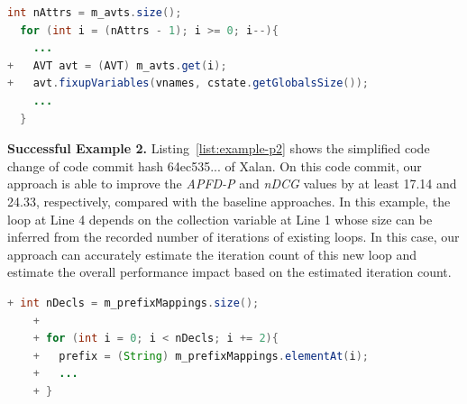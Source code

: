 

{\fontsize{10}{10}
\begin{lstlisting}[columns=flexible,language=Java,caption=Change Inside a Loop, label={list:example-p1}]
  int nAttrs = m_avts.size();
  for (int i = (nAttrs - 1); i >= 0; i--){
    ...
+   AVT avt = (AVT) m_avts.get(i);
+   avt.fixupVariables(vnames, cstate.getGlobalsSize());
    ...
  } 
\end{lstlisting}
}


\textbf{Successful Example 2.} Listing~\ref{list:example-p2} shows the simplified code change of code commit hash 64ec535... of Xalan. On this code commit, our approach is able to improve the \textit{APFD-P} and \textit{nDCG} values by at least 17.14 and 24.33, respectively, compared with the baseline approaches. In this example, the loop at Line 4 depends on the collection variable  at Line 1 whose size can be inferred from the recorded number of iterations of existing loops. In this case, our approach can accurately estimate the iteration count of this new loop and estimate the overall performance impact based on the estimated iteration count.\\

{\fontsize{10}{10}
	\begin{lstlisting}[columns=flexible,language=Java,caption=A Newly Added Loop Correlating to an Existing Collection, label={list:example-p2}]
	+ int nDecls = m_prefixMappings.size();
	+      
	+ for (int i = 0; i < nDecls; i += 2){
	+   prefix = (String) m_prefixMappings.elementAt(i);
	+   ...
	+ }     
	\end{lstlisting}
}




